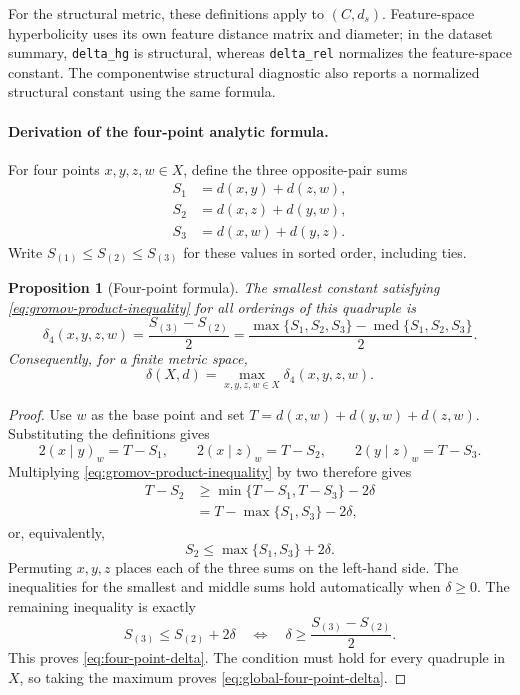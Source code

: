 \documentclass{article}
\theoremstyle{definition}
\theoremstyle{plain}
\newtheorem{proposition}{Proposition}
\begin{document}
For the structural metric, these definitions apply to $(C,d_s)$.
Feature-space hyperbolicity uses its own feature distance matrix and
diameter; in the dataset summary, \texttt{delta\_hg} is structural,
whereas \texttt{delta\_rel} normalizes the feature-space constant.
The componentwise structural diagnostic also reports a normalized
structural constant using the same formula.

\paragraph{Derivation of the four-point analytic formula.}
For four points $x,y,z,w\in X$, define the three opposite-pair sums
\begin{align*}
  S_1&=d(x,y)+d(z,w),\\
  S_2&=d(x,z)+d(y,w),\\
  S_3&=d(x,w)+d(y,z).
\end{align*}
Write $S_{(1)}\leq S_{(2)}\leq S_{(3)}$ for these values in sorted
order, including ties.

\begin{proposition}[Four-point formula]
\label{prop:four-point-formula}
The smallest constant satisfying
\eqref{eq:gromov-product-inequality} for all orderings of this quadruple is
\begin{equation}
  \label{eq:four-point-delta}
  \boxed{\delta_4(x,y,z,w)=\frac{S_{(3)}-S_{(2)}}{2}
    =\frac{\max\{S_1,S_2,S_3\}-\operatorname{med}\{S_1,S_2,S_3\}}{2}.}
\end{equation}
Consequently, for a finite metric space,
\begin{equation}
  \label{eq:global-four-point-delta}
  \boxed{\delta(X,d)=\max_{x,y,z,w\in X}\delta_4(x,y,z,w).}
\end{equation}
\end{proposition}

\begin{proof}
Use $w$ as the base point and set
$T=d(x,w)+d(y,w)+d(z,w)$. Substituting the definitions gives
\[
  2(x\mid y)_w=T-S_1,\qquad
  2(x\mid z)_w=T-S_2,\qquad
  2(y\mid z)_w=T-S_3.
\]
Multiplying \eqref{eq:gromov-product-inequality} by two therefore gives
\begin{align*}
  T-S_2
    &\geq\min\{T-S_1,T-S_3\}-2\delta\\
    &=T-\max\{S_1,S_3\}-2\delta,
\end{align*}
or, equivalently,
\[
  S_2\leq\max\{S_1,S_3\}+2\delta.
\]
Permuting $x,y,z$ places each of the three sums on the left-hand side.
The inequalities for the smallest and middle sums hold automatically
when $\delta\geq0$. The remaining inequality is exactly
\[
  S_{(3)}\leq S_{(2)}+2\delta
  \quad\Longleftrightarrow\quad
  \delta\geq\frac{S_{(3)}-S_{(2)}}{2}.
\]
This proves \eqref{eq:four-point-delta}. The condition must hold for
every quadruple in $X$, so taking the maximum proves
\eqref{eq:global-four-point-delta}.
\end{proof}
\end{document}
